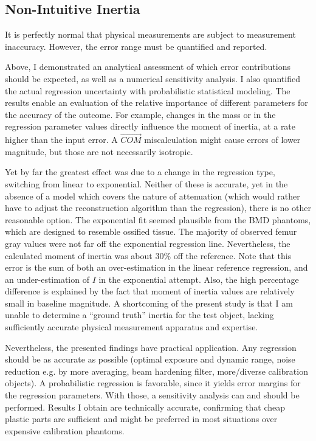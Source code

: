\subsection{Non-Intuitive Inertia}
\label{sec:org07905d3}
It is perfectly normal that physical measurements are subject to measurement inaccuracy.
However, the error range must be quantified and reported.

Above, I demonstrated an analytical assessment of which error contributions should be expected, as well as a numerical sensitivity analysis.
I also quantified the actual regression uncertainty with probabilistic statistical modeling.
The results enable an evaluation of the relative importance of different parameters for the accuracy of the outcome.
For example, changes in the mass or in the regression parameter values directly influence the moment of inertia, at a rate higher than the input error.
A \(\vec{COM}\) miscalculation might cause errors of lower magnitude, but those are not necessarily isotropic.


Yet by far the greatest effect was due to a change in the regression type, switching from linear to exponential.
Neither of these is accurate, yet in the absence of a model which covers the nature of attenuation (which would rather have to adjust the reconstruction algorithm than the regression), there is no other reasonable option.
The exponential fit seemed plausible from the BMD phantoms, which are designed to resemble ossified tissue.
The majority of observed femur gray values were not far off the exponential regression line.
Nevertheless, the calculated moment of inertia was about \(30 \%\) off the reference.
Note that this error is the sum of both an over-estimation in the linear reference regression, and an under-estimation of \(I\) in the exponential attempt.
Also, the high percentage difference is explained by the fact that moment of inertia values are relatively small in baseline magnitude.
A shortcoming of the present study is that I am unable to determine a ``ground truth'' inertia for the test object, lacking sufficiently accurate physical measurement apparatus and expertise.


Nevertheless, the presented findings have practical application.
Any regression should be as accurate as possible (optimal exposure and dynamic range, noise reduction e.g. by more averaging, beam hardening filter, more/diverse calibration objects).
A probabilistic regression is favorable, since it yields error margins for the regression parameters.
With those, a sensitivity analysis can and should be performed.
Results I obtain are technically accurate, confirming that cheap plastic parts are sufficient and might be preferred in most situations over expensive calibration phantoms.


